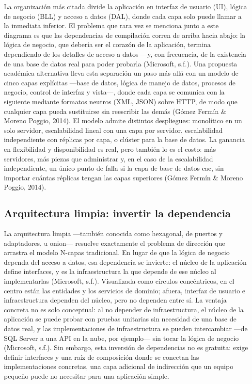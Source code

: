 \documentclass[
  spanish,
  12pt,
  letterpaper,
]{article}
\begin{document}
La organización más citada divide la aplicación en interfaz de usuario
(UI), lógica de negocio (BLL) y acceso a datos (DAL), donde cada capa
solo puede llamar a la inmediata inferior. El problema que rara vez se
menciona junto a este diagrama es que las dependencias de compilación
corren de arriba hacia abajo: la lógica de negocio, que debería ser el
corazón de la aplicación, termina dependiendo de los detalles de acceso
a datos ---y, con frecuencia, de la existencia de una base de datos real
para poder probarla (Microsoft, s.f.). Una propuesta académica
alternativa lleva esta separación un paso más allá con un modelo de
cinco capas explícitas ---base de datos, lógica de manejo de datos,
procesos de negocio, control de interfaz y vista---, donde cada capa se
comunica con la siguiente mediante formatos neutros (XML, JSON) sobre
HTTP, de modo que cualquier capa pueda sustituirse sin reescribir las
demás (Gómez Fermín \& Moreno Poggio, 2014). El modelo admite distintos
despliegues: monolítico en un solo servidor, escalabilidad lineal con
una capa por servidor, escalabilidad independiente con réplicas por
capa, o clúster para la base de datos. La ganancia en flexibilidad y
disponibilidad es real, pero también lo es el costo: más servidores, más
piezas que administrar y, en el caso de la escalabilidad independiente,
un único punto de falla si la capa de base de datos cae, sin importar
cuántas réplicas tengan las capas superiores (Gómez Fermín \& Moreno
Poggio, 2014).

\subsection{Arquitectura limpia: invertir la
dependencia}\label{arquitectura-limpia-invertir-la-dependencia}

La arquitectura limpia ---también conocida como hexagonal, de puertos y
adaptadores, u onion--- resuelve exactamente el problema de dirección
que arrastra el modelo N-capas tradicional. En lugar de que la lógica de
negocio dependa del acceso a datos, esa dependencia se invierte: el
núcleo de la aplicación define interfaces, y es la infraestructura la
que depende de ese núcleo al implementarlas (Microsoft, s.f.).
Visualizada como círculos concéntricos, en el centro están las entidades
y los servicios de dominio; afuera, interfaz de usuario e
infraestructura dependen del núcleo, pero no dependen entre sí. La
ventaja concreta no es solo conceptual: al no depender de
infraestructura, el núcleo de la aplicación se puede probar con pruebas
unitarias sin necesidad de una base de datos real, y las
implementaciones de infraestructura se pueden intercambiar ---de SQL
Server a una API en la nube, por ejemplo--- sin tocar la lógica de
negocio (Microsoft, s.f.). Sin embargo, esta inversión de dependencias
no es gratuita: exige definir interfaces y una raíz de composición donde
se conectan las implementaciones concretas, una capa adicional de
indirección que un equipo pequeño puede no necesitar para una aplicación
simple.
\end{document}
